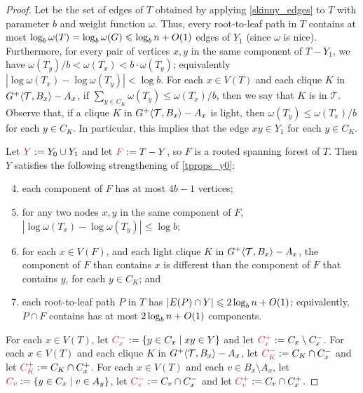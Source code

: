\begin{proof}
  Let  be the set of edges of $T$ obtained by applying \cref{skinny_edges} to $T$ with parameter $b$ and weight function $\omega$. Thus, every root-to-leaf path in $T$ contains at most $\log_b \omega(T)=\log_b\omega(G)\leqslant\log_b n+O(1)$ edges of $Y_1$ (since $\omega$ is nice).  Furthermore, for every pair of vertices $x,y$ in the same component of $T-Y_1$, we have $\omega(T_y)/b< \omega(T_x)<b\cdot\omega(T_y)$; equivalently  $|\log\omega(T_x)-\log\omega(T_y)|< \log b$. For each $x\in V(T)$ and each clique $K$ in ${G^+}\langle{\mathcal{T},B_x}\rangle-A_x$, if $\sum_{y\in C_K}\omega(T_y)\le \omega(T_x)/b$, then we say that $K$ is  in $\mathcal{T}$.  Observe that, if a clique $K$ in ${G^+}\langle{\mathcal{T},B_x}\rangle-A_x$ is light, then $\omega(T_y)\le \omega(T_x)/b$ for each $y\in C_K$.  In particular, this implies that the edge $xy\in Y_1$ for each $y\in C_K$.  

  Let $\mathdefin{Y}:=Y_0\cup Y_1$ and let $\mathdefin{F}:=T-Y$, so $F$ is a rooted spanning forest of $T$. Then $Y$ satisfies the following strengthening of \ref{tprops_y0}:
  \begin{enumerate}[nosep,nolistsep,label=(P\arabic*)]\setcounter{enumi}{3}
    \item\label{component_size} each component of $F$ has at most $4b-1$ vertices;
    \item\label{no_fast_shrink} for any two nodes $x,y$ in the same component of $F$, $|\log\omega(T_x)-\log\omega(T_y)|\le\log b$;
    \item\label{light_clique_buster} for each $x\in V(F)$, and each light clique $K$ in ${G^+}\langle{\mathcal{T},B_x}\rangle-A_x$, the component of $F$ than contains $x$ is different than the component of $F$ that contains $y$, for each $y\in C_K$; and
    \item\label{y_on_path} each root-to-leaf path $P$ in $T$ has $|E(P)\cap Y|\leqslant 2\log_b n+O(1)$; equivalently, $P\cap F$ contains has at most $2\log_b n + O(1)$ components.
  \end{enumerate}

  For each $x\in V(T)$, let $\mathdefin{C^-_x}:=\{y\in C_x\mid xy\in Y\}$ and let $\mathdefin{C^+_x}:=C_x\setminus C^-_x$.  For each $x\in V(T)$ and each clique $K$ in ${G^+}\langle{\mathcal{T},B_x}\rangle-A_x$, let $\mathdefin{C^-_K}:=C_K\cap C^-_x$ and let $\mathdefin{C^+_K}:=C_K\cap C^+_x$. For each $x\in V(T)$ and each $v\in B_x\setminus A_x$, let $\mathdefin{C_v}:=\{y\in C_x\mid v\in A_y\}$, let $\mathdefin{C^-_v}:=C_v\cap C^-_x$ and let $\mathdefin{C^+_v}:=C_v\cap C^+_x$.  
  



\end{proof}
